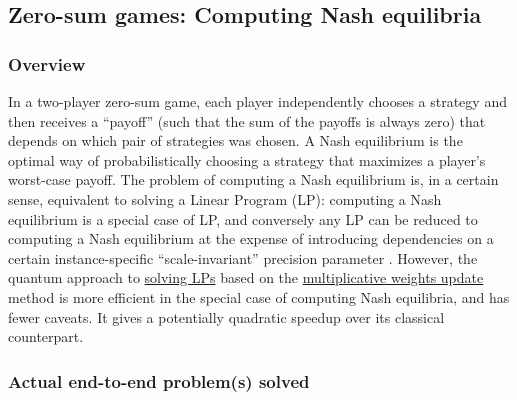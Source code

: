 \begin{refsection}
\subsection{Zero-sum games: Computing Nash equilibria }\label{appl:ZeroSumGames}

\subsubsection*{Overview}

In a two-player zero-sum game, each player independently chooses a strategy and then receives a ``payoff'' (such that the sum of the payoffs is always zero) that depends on which pair of strategies was chosen. A Nash equilibrium is the optimal way of probabilistically choosing a strategy that maximizes a player's worst-case payoff. The problem of computing a Nash equilibrium is, in a certain sense, equivalent to solving a Linear Program (LP): computing a Nash equilibrium is a special case of LP, and conversely any LP can be reduced to computing a Nash equilibrium at the expense of introducing dependencies on a certain instance-specific ``scale-invariant'' precision parameter \cite{apeldoorn2019QAlgorithmsForZeroSumGames}.
However, the quantum approach to \hyperref[appl:ConicProgramming]{solving LPs} based on the \hyperref[prim:MWU]{multiplicative weights update} method \cite{apeldoorn2019QAlgorithmsForZeroSumGames} is more efficient in the special case of computing Nash equilibria, and has fewer caveats. It gives a potentially quadratic speedup over its classical counterpart. 

\subsubsection*{Actual end-to-end problem(s) solved}


\end{refsection}
